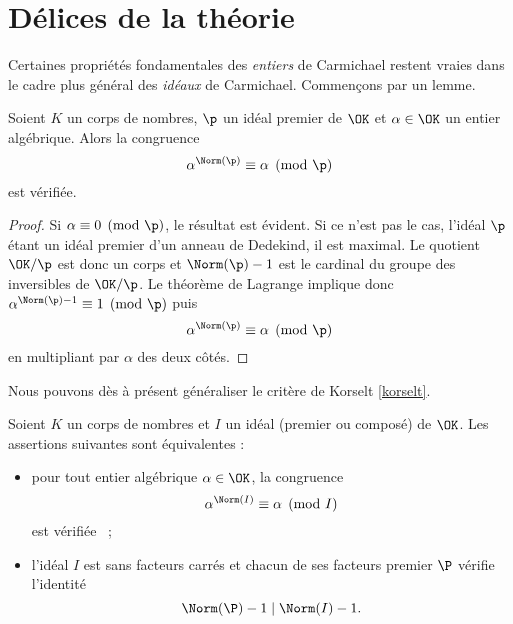 \section{Délices de la théorie}

Certaines propriétés fondamentales des \emph{entiers} de Carmichael restent vraies dans le cadre plus général des \emph{idéaux} de Carmichael. Commençons par un lemme.

\begin{lemme}\label{identite-1}
	Soient $K$ un corps de nombres, $\p$ un idéal premier de $\OK$ et $\alpha \in \OK$ un entier algébrique. Alors la congruence \[\alpha^{\Norm(\p)} \equiv \alpha \pmod{\p}\] est vérifiée.
\end{lemme}

\begin{proof}
	Si $\alpha\equiv 0\pmod{\p}$, le résultat est évident. Si ce n'est pas le cas, l'idéal $\p$ étant un idéal premier d'un anneau de Dedekind, il est maximal. Le quotient $\OK/\p$ est donc un corps et $\Norm(\p) -1$ est le cardinal du groupe des inversibles de $\OK/\p$. Le théorème de Lagrange implique donc $\alpha^{\Norm(\p)-1}\equiv 1 \pmod{\p}$ puis \[\alpha^{\Norm(\p)} \equiv \alpha \pmod{\p}\] en multipliant par $\alpha$ des deux côtés.
\end{proof}

Nous pouvons dès à présent généraliser le critère de Korselt \ref{korselt}.

\begin{theoreme}\label{korselt-generalise}
	Soient $K$ un corps de nombres et $I$ un idéal (premier ou composé) de $\OK$. Les assertions suivantes sont équivalentes :
	\begin{itemize}
		\item pour tout entier algébrique $\alpha \in \OK$, la congruence \[\alpha^{\Norm(I)} \equiv \alpha \pmod{I}\] est vérifiée ~;
		\item l'idéal $I$ est sans facteurs carrés et chacun de ses facteurs premier $\P$ vérifie l'identité \[\Norm(\P) - 1 \mid \Norm(I) - 1.\]
	\end{itemize}
\end{theoreme}

